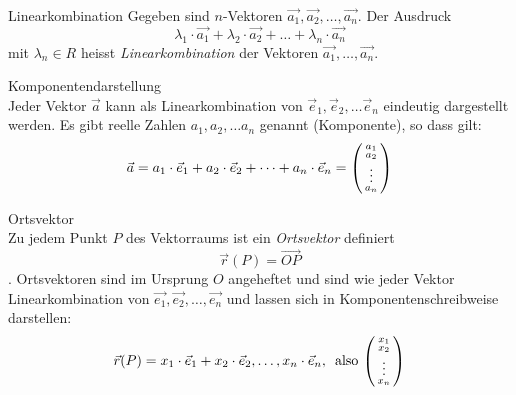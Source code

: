 \begin{definition}{Linearkombination}
    Gegeben sind $n$-Vektoren $\vec{a_1},\vec{a_2},\ldots,\vec{a_n}$.
    Der Ausdruck
    \begin{equation*}
        \lambda_1\cdot\vec{a_1}+\lambda_2\cdot\vec{a_2}+\ldots+\lambda_n\cdot\vec{a_n}
    \end{equation*}
    mit $\lambda_n\in R$ heisst \textit{Linearkombination} der Vektoren $\vec{a_1},\ldots,\vec{a_n}$.
\end{definition}


\begin{definition}{Komponentendarstellung}\\
    Jeder Vektor $\vec{a}$ kann als Linearkombination von $\vec{e}_1, \vec{e}_2,\ldots\vec{e}_n$
    eindeutig dargestellt werden. 
    Es gibt reelle Zahlen $a_1, a_2, \ldots a_n$ genannt (Komponente), so dass gilt:
    \begin{equation*}
        \vec{a}=a_1\cdot\vec{e}_1+a_2\cdot\vec{e}_2+\cdots+a_n\cdot\vec{e}_n=
        \begin{psmallmatrix}
            a_1\\a_2\\\vdots\\a_n
        \end{psmallmatrix}
    \end{equation*}
\end{definition}

\begin{definition}{Ortsvektor}\\
    Zu jedem Punkt $P$ des Vektorraums ist ein \textit{Ortsvektor} definiert
    \begin{equation*}
        \vec{r}(P)=\overrightarrow{OP}
    \end{equation*}.
    Ortsvektoren sind im Ursprung $O$ angeheftet und sind wie jeder Vektor Linearkombination 
    von $\vec{e_1}, \vec{e_2},\ldots, \vec{e_n}$ und lassen sich in Komponentenschreibweise darstellen:
    \begin{equation*}
        \vec{r}(P)=x_1\cdot\vec{e}_1+x_2\cdot\vec{e}_2,\ldots,x_n\cdot\vec{e}_n,\, \text{ also }
        \begin{psmallmatrix}
            x_1\\x_2\\\vdots\\x_n
        \end{psmallmatrix}
    \end{equation*}
\end{definition}


